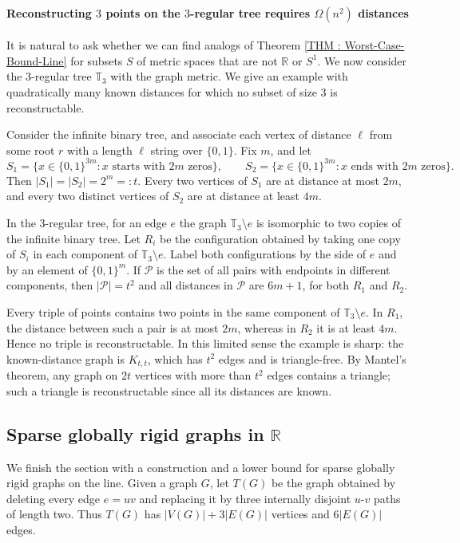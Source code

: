 \documentclass[fullpage,11pt]{article}
\newcommand{\R}{\mathbb{R}}
\theoremstyle{break}
\theoremstyle{definition}
\theoremstyle{break}
\begin{document}
\paragraph{Reconstructing $3$ points on the $3$-regular tree requires $\Omega(n^2)$ distances}

It is natural to ask whether we can find analogs of Theorem \ref{THM : Worst-Case-Bound-Line} for subsets $S$ of metric spaces that are not $\R$ or $S^1$. We now consider the 3-regular tree $\mathbb{T}_3$ with the graph metric. We give an example with quadratically many known distances for which no subset of size 3 is reconstructable.

Consider the infinite binary tree, and associate each vertex of distance $\ell$ from some root $r$ with a length $\ell$ string over $\{0,1\}$. Fix $m$, and let
\[
    S_1=\{x\in\{0,1\}^{3m}: \text{$x$ starts with $2m$ zeros}\},
    \qquad
    S_2=\{x\in\{0,1\}^{3m}: \text{$x$ ends with $2m$ zeros}\}.
\]
Then $|S_1|=|S_2|=2^m=:t$. Every two vertices of $S_1$ are at distance at most $2m$, and every two distinct vertices of $S_2$ are at distance at least $4m$.

In the $3$-regular tree, for an edge $e$ the graph $\mathbb{T}_3 \setminus{e}$ is isomorphic to two copies of the infinite binary tree. Let $R_i$ be the configuration obtained by taking one copy of $S_i$ in each component of $\mathbb{T}_3 \setminus{e}$. Label both configurations by the side of $e$ and by an element of $\{0,1\}^m$. If $\mathcal{P}$ is the set of all pairs with endpoints in different components, then $|\mathcal{P}|=t^2$ and all distances in $\mathcal{P}$ are $6m+1$, for both $R_1$ and $R_2$.

Every triple of points contains two points in the same component of $\mathbb{T}_3\setminus e$. In $R_1$, the distance between such a pair is at most $2m$, whereas in $R_2$ it is at least $4m$. Hence no triple is reconstructable. In this limited sense the example is sharp: the known-distance graph is $K_{t,t}$, which has $t^2$ edges and is triangle-free. By Mantel's theorem, any graph on $2t$ vertices with more than $t^2$ edges contains a triangle; such a triangle is reconstructable since all its distances are known.

\subsection{Sparse globally rigid graphs in $\mathbb{R}$}

We finish the section with a construction and a lower bound for sparse
globally rigid graphs on the line. Given a graph \(G\), let \(T(G)\) be the
graph obtained by deleting every edge \(e=uv\) and replacing it by three
internally disjoint \(u\)-\(v\) paths of length two. Thus \(T(G)\) has
\(|V(G)|+3|E(G)|\) vertices and \(6|E(G)|\) edges.
\end{document}
